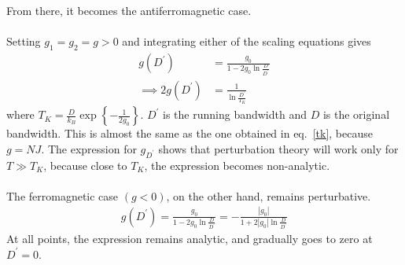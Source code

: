 \documentclass[twoside]{report}
\numberwithin{equation}{section}
\begin{document}
From there, it becomes the antiferromagnetic case.\\\\
Setting \(g_1 = g_2 =g >0\) and integrating either of the scaling equations gives
\begin{equation}\begin{aligned}
	\label{isot}
g(D^\prime) &= \frac{g_0}{1-2g_0\ln\frac{D}{D^\prime}} \\
\implies 2g(D^\prime) &= \frac{1}{\ln \frac{D^\prime}{T_K}}
\end{aligned}\end{equation}
where \(T_K = \frac{D}{k_B} \exp\left\{-\frac{1}{2g_0}\right\}\).
\(D^\prime\) is the running bandwidth and \(D\) is the original bandwidth.
This is almost the same as the one obtained in eq.~\ref{tk}, because \(g = N J\).
The expression for \(g_{D^\prime}\) shows that perturbation theory will work only for \(T \gg T_K\), because close to \(T_K\), the expression becomes non-analytic.\\\\
The ferromagnetic case \((g<0)\), on the other hand, remains perturbative.
\begin{equation}\begin{aligned}
g(D^\prime) = \frac{g_0}{1-2g_0\ln\frac{D}{D^\prime}} = -\frac{|g_0|}{1+2|g_0|\ln\frac{D}{D^\prime}}
\end{aligned}\end{equation}
At all points, the expression remains analytic, and gradually goes to zero at \(D^\prime = 0\).
\end{document}
